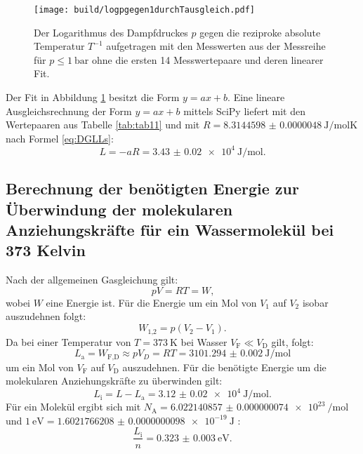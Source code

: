 \begin{figure}
	\centering
	\caption{Der Logarithmus des Dampfdruckes $p$ gegen die reziproke absolute Temperatur $T^{-1}$ aufgetragen mit den Messwerten aus der Messreihe für $p\leq \SI{1}{\bar}$ ohne die ersten 14 Messwertepaare und deren linearer Fit.}
	\texttt{[image: build/logpgegen1durchTausgleich.pdf]}
	\label{fig:Graph2}
\end{figure}
Der Fit in Abbildung \ref{fig:Graph2} besitzt die Form $y=a x + b$. Eine lineare Ausgleichsrechnung der Form $y=a x + b$ mittels SciPy \cite{scipy} liefert mit den Wertepaaren aus Tabelle \ref{tab:tab11} und mit $R=\SI{8.3144598(48)}{\joule\per\mol\kelvin}$ \cite{R} nach Formel \eqref{eq:DGLLs}:
\begin{displaymath}
L = -a R = \SI{3.43(2)e4}{\joule\per\mol}\text{.}
\end{displaymath}

\subsection{Berechnung der benötigten Energie zur Überwindung der molekularen Anziehungskräfte für ein Wassermolekül bei 373 Kelvin}
Nach der allgemeinen Gasgleichung gilt:
\begin{equation}
p V = R T = W \text{,}\label{eq:Gas}
\end{equation}
wobei $W$ eine Energie ist.
Für die Energie um ein Mol von $V_1$ auf $V_2$ isobar auszudehnen folgt:
\begin{equation}
W_\text{1,2} = p (V_2-V_1)\text{.}
\end{equation}
Da bei einer Temperatur von $T=\SI{373}{\kelvin}$ bei Wasser $V_\text{F}\ll V_\text{D}$ gilt, folgt:
\begin{equation}
	L_\text{a} = W_\text{F,D} \approx p V_D = R T = \SI{3101.294(2)}{\joule\per\mol}
\end{equation}
um ein Mol von $V_\text{F}$ auf $V_\text{D}$ auszudehnen.
Für die benötigte Energie um die molekularen Anziehungskräfte zu überwinden gilt:
\begin{equation}
	L_\text{i}= L - L_\text{a} = \SI{3.12(2)e4}{\joule\per\mol}\text{.}
\end{equation}
Für ein Molekül ergibt sich mit $N_\text{A} = \SI{6.022140857(74)e23}{\per\mol}$ \cite{n} und $\SI{1}{\electronvolt}=\SI{1.6021766208(98)e-19}{\joule}$ \cite{eV}:
\begin{equation}
	\frac{L_\text{i}}{n} = \SI{0.323(3)}{\electronvolt}\text{.}
\end{equation}

